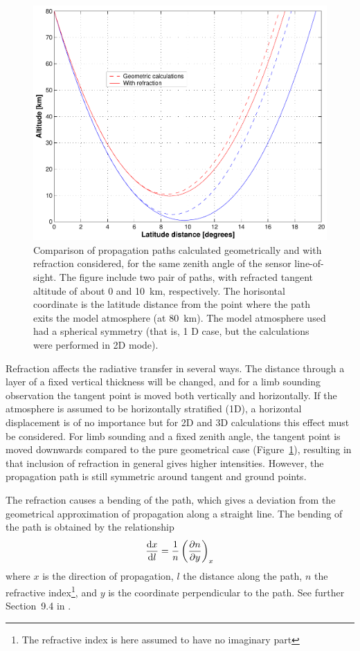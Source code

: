 \begin{figure}[!t]
 \begin{center}
  \includegraphics*[width=0.80\hsize]{Figs/ppath/ppath_refr1}
  \caption{Comparison of propagation paths calculated geometrically and 
    with refraction considered, for the same zenith angle of the
    sensor line-of-sight. The figure include two pair of paths, with
    refracted tangent altitude of about 0 and 10~km, respectively.
    The horisontal coordinate is the latitude distance from the point
    where the path exits the model atmosphere (at 80~km). The model
    atmosphere used had a spherical symmetry (that is, 1 D case, but
    the calculations were performed in 2D mode).}
  \label{fig:ppath:ppath_refr1}  
 \end{center}
\end{figure}

Refraction affects the radiative transfer in several ways. The
distance through a layer of a fixed vertical thickness will be
changed, and for a limb sounding observation the tangent point is
moved both vertically and horizontally. If the atmosphere is assumed
to be horizontally stratified (1D), a horizontal displacement is of no
importance but for 2D and 3D calculations this effect must be
considered. For limb sounding and a fixed zenith angle, the tangent
point is moved downwards compared to the pure geometrical case
(Figure~\ref{fig:ppath:ppath_refr1}), resulting in that inclusion of
refraction in general gives higher intensities. However, the
propagation path is still symmetric around tangent and ground points.

The refraction causes a bending of the path, which gives a deviation
from the geometrical approximation of propagation along a straight
line. The bending of the path is obtained by the relationship
\begin{equation}
  \frac{\mathrm{d} x}{\mathrm{d} l} = \frac{1}{n} \left( \frac{\partial n}{\partial y} \right)_x
  \label{eq:ppath:refrbend}
\end{equation}
where $x$ is the direction of propagation, $l$ the distance along the
path, $n$ the refractive index\footnote{The refractive index is here
  assumed to have no imaginary part}, and $y$ is the coordinate
perpendicular to the path. See further Section~9.4 in
\citet{rodgers:00}.

